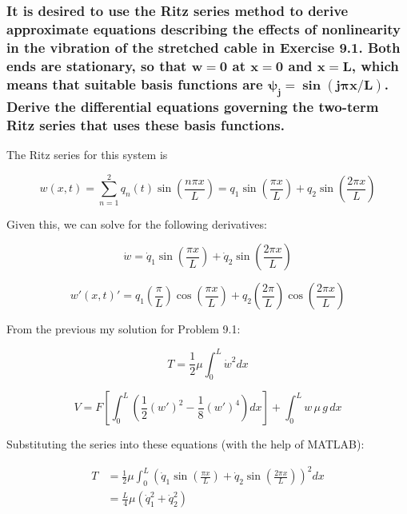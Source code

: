 \documentclass[12pt, letterpaper]{../assignment}
\begin{document}
\subsubsection*{It is desired to use the Ritz series method to derive approximate equations describing the effects of nonlinearity in the vibration of the stretched cable in Exercise 9.1.
Both ends are stationary,
so that $\bm{w = 0}$ at $\bm{x = 0}$ and $\bm{x = L}$,
which means that suitable basis functions are $\bm{\psi_j = \sin(j \pi x/L)}$.
Derive the differential equations governing the two-term Ritz series that uses these basis functions.}

The Ritz series for this system is

$$ w(x,t) = \sum_{n=1}^2 q_n(t) \sin\left(\frac{n \pi x}{L}\right) = 
q_1 \sin\left(\frac{\pi x}{L}\right) + q_2 \sin\left(\frac{2 \pi x}{L}\right)$$

Given this, we can solve for the following derivatives:

$$ \dot{w} =
\dot{q}_1 \sin\left(\frac{\pi x}{L}\right) + \dot{q}_2 \sin\left(\frac{2 \pi x}{L}\right)$$

$$ w'(x,t)' =
q_1 \left(\frac{\pi}{L}\right) \cos\left(\frac{\pi x}{L}\right) + q_2 \left(\frac{2 \pi }{L}\right) \cos\left(\frac{2 \pi x}{L}\right)$$

From the previous my solution for Problem 9.1: 


$$ T = \frac{1}{2}\mu \int_0^L \dot{w}^2 dx $$

$$V = F \left[ \int_0^L \left( \frac{1}{2}(w')^2 - \frac{1}{8}(w')^4 \right) dx \right] + \int_0^L w\,\mu\,g\, dx $$

Substituting the series into these equations (with the help of MATLAB):

\begin{equation*}
  \begin{aligned}
    T &= \frac{1}{2}\mu \int_0^L \left( \dot{q}_1 \sin\left(\frac{\pi x}{L}\right) + \dot{q}_2 \sin\left(\frac{2 \pi x}{L}\right) \right)^2 dx \\
    &= \frac{L}{4}\mu \left( \dot{q}_1^2 + \dot{q}_2^2 \right)
  \end{aligned}
\end{equation*}
\end{document}
